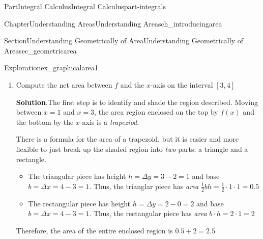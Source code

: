 \documentclass[oneside,10pt,]{tufte-book}
\newcommand{\blocktitlefont}{\relax}
\numberwithin{equation}{chapter}
\begin{document}
\begin{partptx}{Part}{Integral Calculus}{}{Integral Calculus}{}{}{part-integrals}
\begin{chapterptx}{Chapter}{Understanding Areas}{}{Understanding Areas}{}{}{ch_introducingarea}
\begin{sectionptx}{Section}{Understanding Geometrically of Area}{}{Understanding Geometrically of Area}{}{}{sec_geometricarea}
\begin{exploration}{Exploration}{}{ex_graphicalarea1}
\begin{enumerate}[font=\bfseries,label=(\alph*),ref=\alph*]
\begin{image}{0.25}{0.5}{0.25}{}
{
}%
\end{image}%
\item{}Compute the net area between \(f\) and the \(x\)-axis on the interval \([3,4]\)%
\par\smallskip%
\noindent\textbf{\blocktitlefont Solution}.\hypertarget{ex_graphicalarea1-4-2}{}\quad{}The first step is to identify and shade the region described. Moving between \(x=1\) and \(x=3\), the area region enclosed on the top by \(f(x)\) and the bottom by the \(x\)-axis is a \emph{trapeziod}.%
\par
There is a formula for the area of a trapezoid, but it is easier and more flexible to just break up the shaded region into \emph{two} parts: a triangle and a rectangle.%
\begin{itemize}[label=\textbullet]
\item{}The triangular piece has height \(h=\Delta y = 3-2=1\) and base \(b=\Delta x = 4-3=1\). Thus, the trianglar piece has \emph{area} \(\frac{1}{2} b h = \frac{1}{2} \cdot 1\cdot 1 = 0.5 \)%
\item{}The rectangular piece has height \(h=\Delta y = 2-0=2\) and base \(b=\Delta x = 4-3=1\). Thus, the rectangular piece has \emph{area} \(b\cdot h= 2 \cdot 1 = 2\)%
\end{itemize}
Therefore, the area of the entire enclosed region is \(0.5 + 2 = 2.5\)%
\begin{image}{0.25}{0.5}{0.25}{}%
\end{image}
\end{enumerate}
\end{exploration}
\end{sectionptx}
\end{chapterptx}
\end{partptx}
\end{document}
